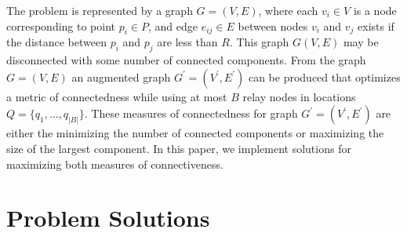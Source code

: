 \documentclass{article}
\begin{document}
The problem is represented by a graph $G=(V,E)$, where each $v_i\in V$ is a node corresponding to point $p_i\in P$, and edge $e_{ij}\in E$ between nodes $v_i$ and $v_j$ exists if the distance between $p_i$ and $p_j$ are less than $R$.
This graph $G(V, E)$ may be disconnected with some number of connected components.
From the graph $G=(V,E)$ an augmented graph $G^\prime=(V^\prime, E^\prime)$ can be produced that optimizes a metric of connectedness while using at most $B$ relay nodes in locations $Q=\{q_1, \hdots, q_{|B|}\}$.
These measures of connectedness for graph $G^\prime=(V^\prime, E^\prime)$ are either the minimizing the number of connected components or maximizing the size of the largest component.
In this paper, we implement solutions for maximizing both measures of connectiveness.

\section{Problem Solutions}
\end{document}
